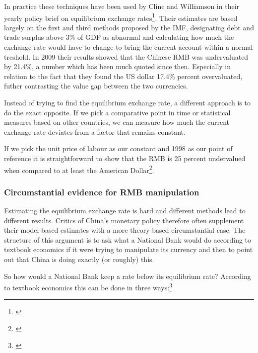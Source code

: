 \documentclass[11pt]{article}
\begin{document}
In practice these techniques have been used by Cline and Williamson in 
their yearly policy brief on equilibrium exchange 
rates\footnote{\cite{cline2009,cline2012}}.  Their estimates are based 
largely on the first and third methods proposed by the IMF, designating 
debt and trade surplus above 3\% of GDP as abnormal and calculating how 
much the exchange rate would have to change to bring the current account 
within a normal treshold. In 2009 their results showed that the Chinese 
RMB was undervaluated by 21.4\%, a number which has been much quoted 
since then. Especially in relation to the fact that they found the US 
dollar 17.4\% percent overvaluated, futher contrasting the value gap 
between the two currencies.

% 
Instead of trying to find the equilibrium exchange rate, a different 
approach is to do the exact opposite. If we pick a comparative point in 
time or statistical measures based on other countries, we can measure 
how much the current exchange rate deviates from a factor that remains 
constant.

If we pick the unit price of labour as our constant and 1998 as our 
point of reference it is straightforward to show that the RMB is 25 
percent undervalued when compared to at least the American 
Dollar\footnote{\cite{chimerica2009}}. 


\subsubsection{Circumstantial evidence for RMB manipulation}

Estimating the equilibrium exchange rate is hard and different methods lead to different results. Critics of China's monetary policy therefore often supplement their model-based estimates with a more theory-based circumstantial case. The structure of this argument is to ask what a National Bank would do according to textbook economics if it were trying to manipulate its currency and then to point out that China is doing exactly (or roughly) this. 


So how would a National Bank keep a rate below its equilibrium rate? According to 
textbook economics this can be done in three ways:\footnote{\cite[pp. 
514]{Krugman2008}}
\end{document}
